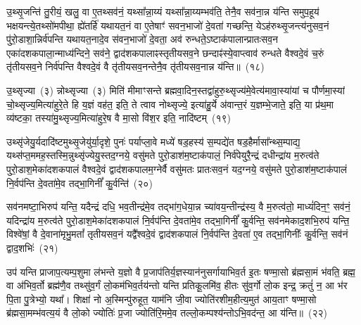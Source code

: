 {%
उ॒थ्सृ॒जन्ति॑ तु॒रीयं॒ खलु॒ वा ए॒तथ्सव॑नं॒ यथ्सा᳚न्ना॒य्यं यथ्सा᳚न्ना॒य्यम्भव॑ति॒ तेनै॒व सव॑ना॒न्न य॑न्ति समुप॒हूय॑ भक्षयन्त्ये॒तथ्सो॑मपीथा॒ ह्ये॑तर्\mbox{}हि॑ यथायत॒नं वा ए॒तेषाꣳ॑ सवन॒भाजो॑ दे॒वता॑ गच्छन्ति॒ ये\-ऽह॑रुथ्सृ॒जन्त्य॑नुसव॒नं पु॑रो॒डाशा॒न्निर्व॑पन्ति यथायत॒नादे॒व स॑वन॒भाजो॑ दे॒वता॒ अव॑ रुन्धते॒\-ऽष्टाक॑पालान्प्रातःसव॒न एका॑\-दश\-कपाला॒\-न्माध्य॑न्दिने॒ सव॑ने॒ द्वाद॑श\-कपालाꣴस्तृतीयसव॒ने छन्दाꣴ॑स्ये॒वाप्त्वाव॑ रुन्धते वैश्वदे॒वं च॒रुं तृ॑तीयसव॒ने निर्व॑पन्ति वैश्वदे॒वं वै तृ॑तीयसव॒नन्तेनै॒व तृ॑तीयसव॒नान्न य॑न्ति॥~(१८)

{\anuvakamend[{उ॒दच॒त्युद्ये\-ऽह॑रा॒प्त्वा पञ्च॑दश च}]}%

उ॒थ्सृज्या~(३) न्नोथ्सृज्या~(३) मिति॑ मीमाꣳसन्ते ब्रह्मवा॒दिन॒स्तद्वा॑हुरु॒थ्सृज्य॑मे॒वेत्य॑मावा॒स्या॑यां च पौर्णमा॒स्यां चो॒थ्सृज्य॒मित्या॑हुरे॒ते हि य॒ज्ञं वह॑त॒ इति॒ ते त्वाव नोथ्सृज्ये॒ इत्या॑हु॒र्ये अ॑वान्त॒रं य॒ज्ञम्भे॒जाते॒ इति॒ या प्र॑थ॒मा व्य॑ष्टका॒ तस्या॑मु॒थ्सृज्य॒मित्या॑हुरे॒ष वै मा॒सो वि॑श॒र इति॒ नादि॑ष्टम्~(१९)

उथ्सृ॑जेयु॒र्यदादि॑ष्टमुथ्सृ॒जेयु॑र्या॒दृशे॒ पुनः॑ पर्याप्ला॒वे मध्ये॑ षड॒हस्य॑ स॒म्पद्ये॑त षड॒हैर्मासा᳚न्थ्स॒म्पाद्य॒ यथ्स॑प्त॒ममह॒\-स्तस्मि॒न्नुथ्सृ॑ज्येयु॒स्तद॒ग्नये॒ वसु॑मते पुरो॒डाश॑\-म॒ष्टा\-क॑पालं॒ निर्व॑पेयुरै॒न्द्रं दधीन्द्रा॑य म॒रुत्व॑ते पुरो॒डाश॒मेका॑\-दश\-कपालं वैश्वदे॒वं द्वाद॑श\-कपालम॒ग्नेर्वै वसु॑मतः प्रातःसव॒नं यद॒ग्नये॒ वसु॑मते पुरो॒डाश॑\-म॒ष्टाक॑पालं नि॒र्वप॑न्ति दे॒वता॑मे॒व तद्भा॒गिनीं᳚ कु॒र्वन्ति॑~(२०)

सव॑नमष्टा॒भिरुप॑ यन्ति॒ यदैन्द्रं दधि॒ भव॒तीन्द्र॑मे॒व तद्भा॑ग॒धेया॒न्न च्या॑वय॒न्तीन्द्र॑स्य॒ वै म॒रुत्व॑तो॒ माध्यं॑दिन॒ꣳ॒ सव॑नं॒ यदिन्द्रा॑य म॒रुत्व॑ते पुरो॒डाश॒मेका॑\-दश\-कपालं नि॒र्वप॑न्ति दे॒वता॑मे॒व तद्भा॒गिनीं᳚ कु॒र्वन्ति॒ सव॑नमेकाद॒शभि॒रुप॑ यन्ति॒ विश्वे॑षां॒ वै दे॒वाना॑मृभु॒मतां᳚ तृतीयसव॒नं यद्वै᳚श्वदे॒वं द्वाद॑श\-कपालं नि॒र्वप॑न्ति दे॒वता॑ ए॒व तद्भा॒गिनीः᳚ कु॒र्वन्ति॒ सव॑नं द्वाद॒शभिः॑~(२१)

उप॑ यन्ति प्राजाप॒त्यम्प॒शुमा ल॑भन्ते य॒ज्ञो वै प्र॒जा\-प॑तिर्य॒ज्ञस्यान॑नुसर्गायाभिव॒र्त इ॒तः षण्मा॒सो ब्र॑ह्मसा॒मं भ॑वति॒ ब्रह्म॒ वा अ॑भिव॒र्तो ब्रह्म॑णै॒व तथ्सु॑व॒र्गं लो॒कम॑भिव॒र्तय॑न्तो यन्ति प्रतिकू॒लमि॑व॒ हीतः सु॑व॒र्गो लो॒क इन्द्र॒ क्रतुं॑ न॒ आ भ॑र पि॒ता पु॒त्रेभ्यो॒ यथा᳚। शिक्षा॑ नो अ॒स्मिन्पु॑रुहूत॒ याम॑नि जी॒वा ज्योति॑रशीम॒हीत्य॒मुत॑ आय॒ताꣳ षण्मा॒सो ब्र॑ह्मसा॒मम्भ॑वत्य॒यं वै लो॒को ज्योतिः॑ प्र॒जा ज्योति॑रि॒ममे॒व तल्लो॒कम्पश्य॑न्तो\-ऽभि॒वद॑न्त॒ आ य॑न्ति॥~(२२)

{\anuvakamend[{नादि॑ष्टङ्कु॒र्वन्ति॑ द्वाद॒शभि॒रिति॑ विꣳश॒तिश्च॑}]}%

}
